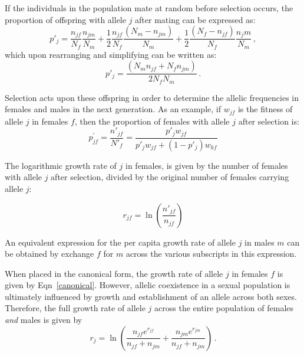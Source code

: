 \documentclass[]{article}
\begin{document}
If the individuals in the population mate at random before selection occurs, the proportion of offspring with allele $j$ after mating can be expressed as:
\begin{equation}
   p'_{j}= \frac{n_{jf}}{N_{f}} \frac{n_{jm}}{N_{m}} + \frac{1}{2} \frac{n_{jf}}{N_{f}} \frac{(N_{m}-n_{jm})}{N_{m}} +\frac{1}{2}
   \frac{(N_{f}-n_{jf})}{N_{f}} \frac{n_jm}{N_{m}} \,,
\end{equation}
which upon rearranging and simplifying can be written as:
\begin{equation}
   p'_{j}= \frac{(N_{m}n_{jf}+ N_{f}n_{jm})}{2 N_{f}N_{m}} \,.
   \label{pprime}
\end{equation}

Selection acts upon these offspring in order to determine the allelic frequencies in females and males in the next generation. As an example, if $w_{jf}$ is the fitness of allele $j$ in females $f$, then the proportion of females with allele $j$ after selection is:
\begin{equation}
   p^{\prime}_{jf}= \frac{n'_{jf}}{N'_{f}} = \frac{p'_{j}w_{jf}}{p'_{j}w_{jf}+ (1-p'_{j})w_{kf}}
\end{equation}

The logarithmic growth rate of $j$ in females, is given by the number of females with allele $j$ after selection, divided by the original number of females carrying allele $j$:



\begin{equation}
    r_{jf} = \ln \left( \frac{n'_{jf}}{n_{jf}} \right)
    \label{canonical}
\end{equation}


An equivalent expression for the per capita growth rate of allele $j$ in males $m$ can be obtained by exchange $f$ for $m$ across the various subscripts in this expression.

When placed in the canonical form, the growth rate of allele $j$ in females $f$ is given by Eqn~\ref{canonical}. However, allelic coexistence in a sexual population is ultimately influenced by growth and establishment of an allele across both sexes. Therefore, the full growth rate of allele $j$ across the entire population of females \emph{and} males is given by
\begin{equation}
    r_{j} = \ln \left(  \frac{n_{jf}e^{r_{jf}}}{n_{jf} + n_{jm}}   +  \frac{n_{jm}e^{r_{{jm}}}}{n_{jf} + n_{jm}}  \right) \,.
    \label{full}
\end{equation}
\end{document}
